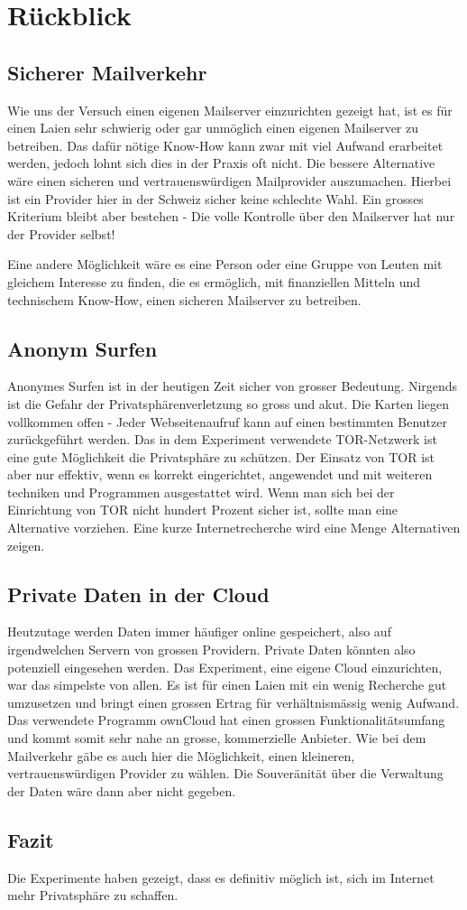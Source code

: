 \section{Rückblick}

\subsection{Sicherer Mailverkehr}

Wie uns der Versuch einen eigenen Mailserver einzurichten gezeigt hat, 
ist es für einen Laien sehr schwierig oder gar unmöglich einen eigenen Mailserver zu betreiben.
Das dafür nötige Know-How kann zwar mit viel Aufwand erarbeitet werden, jedoch lohnt sich dies in der Praxis oft nicht. 
Die bessere Alternative wäre einen sicheren und vertrauenswürdigen Mailprovider auszumachen. 
Hierbei ist ein Provider hier in der Schweiz sicher keine schlechte Wahl. 
Ein grosses Kriterium bleibt aber bestehen - Die volle Kontrolle über den Mailserver hat nur der Provider selbst!

Eine andere Möglichkeit wäre es eine Person oder eine Gruppe von Leuten mit gleichem Interesse zu finden, die es ermöglich,
mit finanziellen Mitteln und technischem Know-How, einen sicheren Mailserver zu betreiben.

\subsection{Anonym Surfen}

Anonymes Surfen ist in der heutigen Zeit sicher von grosser Bedeutung. 
Nirgends ist die Gefahr der Privatsphärenverletzung so gross und akut. 
Die Karten liegen vollkommen offen - Jeder Webseitenaufruf kann auf einen bestimmten Benutzer zurückgeführt werden.
Das in dem Experiment verwendete TOR-Netzwerk ist eine gute Möglichkeit die Privatsphäre zu schützen.
Der Einsatz von TOR ist aber nur effektiv, wenn es korrekt eingerichtet, angewendet und mit weiteren techniken und Programmen ausgestattet wird.
Wenn man sich bei der Einrichtung von TOR nicht hundert Prozent sicher ist, sollte man eine Alternative vorziehen.
Eine kurze Internetrecherche wird eine Menge Alternativen zeigen.

\subsection{Private Daten in der Cloud}

Heutzutage werden Daten immer häufiger online gespeichert, also auf irgendwelchen Servern von grossen Providern. 
Private Daten könnten also potenziell eingesehen werden. Das Experiment, eine eigene Cloud einzurichten, war das simpelste von allen. 
Es ist für einen Laien mit ein wenig Recherche gut umzusetzen und bringt einen grossen Ertrag für verhältnismässig wenig Aufwand.
Das verwendete Programm ownCloud hat einen grossen Funktionalitätsumfang und kommt somit sehr nahe an grosse, kommerzielle Anbieter.
Wie bei dem Mailverkehr gäbe es auch hier die Möglichkeit, einen kleineren, vertrauenswürdigen Provider zu wählen.
Die Souveränität über die Verwaltung der Daten wäre dann aber nicht gegeben.

\subsection{Fazit}

Die Experimente haben gezeigt, dass es definitiv möglich ist, sich im Internet mehr Privatsphäre zu schaffen. 
